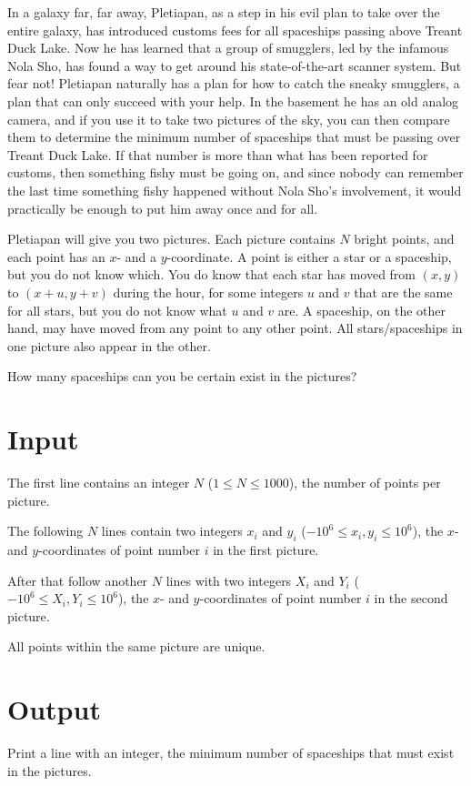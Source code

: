In a galaxy far, far away, Pletiapan, as a step in his evil plan to take over the entire galaxy, has introduced customs fees for all spaceships passing above Treant Duck Lake.
Now he has learned that a group of smugglers, led by the infamous Nola Sho, has found a way to get around his state-of-the-art scanner system.
But fear not! Pletiapan naturally has a plan for how to catch the sneaky smugglers, a plan that can only succeed with your help.
In the basement he has an old analog camera, and if you use it to take two pictures of the sky, you can then compare them to determine the minimum number of spaceships that must be passing over Treant Duck Lake.
If that number is more than what has been reported for customs, then something fishy must be going on, and since nobody can remember the last time something fishy happened without Nola Sho's involvement, it would practically be enough to put him away once and for all.

Pletiapan will give you two pictures. Each picture contains $N$ bright points, and each point has an $x$- and a $y$-coordinate.
A point is either a star or a spaceship, but you do not know which.
You do know that each star has moved from $(x, y)$ to $(x + u, y + v)$ during the hour, for some integers $u$ and $v$ that are the same for all stars, but you do not know what $u$ and $v$ are.
A spaceship, on the other hand, may have moved from any point to any other point. All stars/spaceships in one picture also appear in the other.

How many spaceships can you be certain exist in the pictures?

\section*{Input}
The first line contains an integer $N$ ($1 \leq N \leq 1000$), the number of points per picture.

The following $N$ lines contain two integers $x_i$ and $y_i$ ($-10^6 \leq x_i, y_i \leq 10^6$), the $x$- and $y$-coordinates of point number $i$ in the first picture.

After that follow another $N$ lines with two integers $X_i$ and $Y_i$ ($-10^6 \leq X_i, Y_i \leq 10^6$), the $x$- and $y$-coordinates of point number $i$ in the second picture.

All points within the same picture are unique.

\section*{Output}
Print a line with an integer, the minimum number of spaceships that must exist in the pictures.

